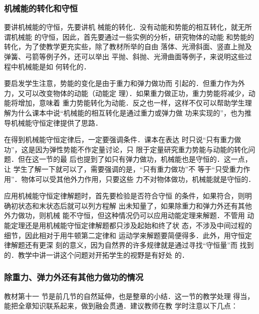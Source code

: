 \subsubsection{机械能的转化和守恒}

要讲机械能的守恒，先要讲机
械能的转化．没有动能和势能的相互转化，就无所谓机械能
的守恒，因此，首先要通过一些实例的分析，研究物体的动能
和势能的转化，为了使教学更充实些，除了教材所举的自由
落体、光滑斜面、竖直上抛及弹簧、弓箭等例子外，还可以举出
平抛、斜抛、光滑曲面等例子，来说明这些过程中机械能是如
何转化的．

要启发学生注意，势能的变化是由于重力和弹力做功而
引起的．但重力作为外力，又可以改变物体的动能（动能定
理）．如果重力做正功，重力势能将减少，动能将增加，意味着
重力势能转化为动能．反之也一样，这样不仅可以帮助学生理
解为什么课本中说“机械能的相互转化是通过重力或弹力做
功来实现的”，也为推导机械能守恒定律提供了思路．

在得到机械能守恒定律后，一定要强调条件．课本在表达
时只说“只有重力做功”，这是因为弹性势能不作定量讨论，只
限于定量研究重力势能与动能的转化问题．但在这一节的最
后也提到了如只有弹力做功，机械能也是守恒的．这一点，让
学生了解一下就可以了，需要强调的是，“只有重力做功”不
等于“只受重力作用”．物体可以受其他外力作用，只要这些
力不对物体做功，机械能就是守恒的．

应用机械能守恒定律解题时，首先要检验是否符合守恒
的条件，如果符合，则明确初状态和末状态后就可以列方程解
出未知量了，如果除重力和弹力外还有其他外力做功，则机械
能不守恒，但这种情况仍可以应用动能定理来解题．不管用
动能定理还是用机械能守恒定律解题都只涉及起始和终了状
态，不涉及中间过程的细节，因此相对于用牛顿第二定律和
运动学来解题要简便得多．此外，用守恒定律解题还有更深
刻的意义，因为自然界的许多规律就是通过寻找“守恒量”而
找到的．教学中讲一讲这个问题对开拓学生的视野是有好处
的．

\subsubsection{除重力、弹力外还有其他力做功的情况}

教材第十一
节是前几节的自然延伸，也是整章的小结．这一节的教学处理
得当，能把全章知识联系起来，做到融会贯通．建议教师在教
学时注意以下几点：

